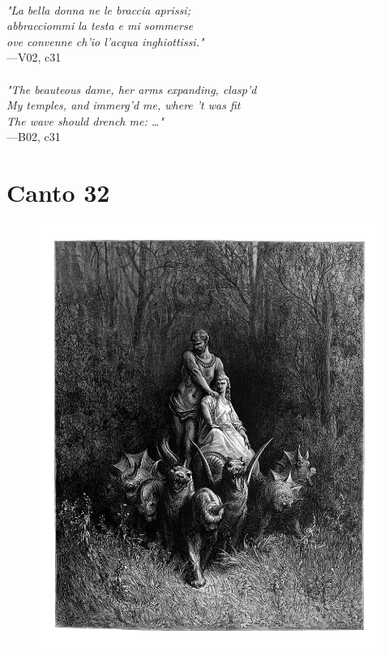 \documentclass[../Dore_vision.tex]{subfiles}
\begin{document}
\begin{center}
\begin{minipage}{0.8\linewidth}
\textit{\\
"La bella donna ne le braccia aprissi;\\abbracciommi la testa e mi sommerse\\ove convenne ch’io l’acqua inghiottissi."} \\
—V02, c31 \\~\\
\textit{"The beauteous dame, her arms expanding, clasp'd\\My temples, and immerg'd me, where 't was fit\\The wave should drench me: …"} \\
—B02, c31
\end{minipage}
\end{center}

\newpage

\section{Canto 32}

\begin{figure}[ht]
\centering
\includegraphics[height=\figsize]{illustrations/book_2/V02, c32.jpg}
\end{figure}
\end{document}
